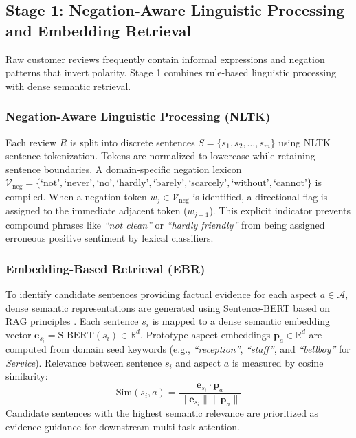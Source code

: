 \documentclass{llncs}
\begin{document}
\subsection{Stage 1: Negation-Aware Linguistic Processing and Embedding Retrieval}
\label{subsec:stage1_nltk_ebr}
Raw customer reviews frequently contain informal expressions and negation patterns that invert polarity. Stage 1 combines rule-based linguistic processing with dense semantic retrieval.

\subsubsection{Negation-Aware Linguistic Processing (NLTK)}
Each review $R$ is split into discrete sentences $S = \{s_1, s_2, \dots, s_m\}$ using NLTK sentence tokenization. Tokens are normalized to lowercase while retaining sentence boundaries. A domain-specific negation lexicon $\mathcal{V}_{\text{neg}} = \{\text{`not'}, \text{`never'}, \text{`no'}, \text{`hardly'}, \text{`barely'}, \text{`scarcely'}, \text{`without'}, \text{`cannot'}\}$ is compiled. When a negation token $w_j \in \mathcal{V}_{\text{neg}}$ is identified, a directional flag is assigned to the immediate adjacent token ($w_{j+1}$). This explicit indicator prevents compound phrases like \textit{``not clean''} or \textit{``hardly friendly''} from being assigned erroneous positive sentiment by lexical classifiers.

\subsubsection{Embedding-Based Retrieval (EBR)}
To identify candidate sentences providing factual evidence for each aspect $a \in \mathcal{A}$, dense semantic representations are generated using Sentence-BERT \cite{ref24_reimers2019} based on RAG principles \cite{ref23_lewis2020}. Each sentence $s_i$ is mapped to a dense semantic embedding vector $\mathbf{e}_{s_i} = \text{S-BERT}(s_i) \in \mathbb{R}^d$. Prototype aspect embeddings $\mathbf{p}_a \in \mathbb{R}^d$ are computed from domain seed keywords (e.g., \textit{``reception''}, \textit{``staff''}, and \textit{``bellboy''} for \textit{Service}). Relevance between sentence $s_i$ and aspect $a$ is measured by cosine similarity:
\begin{equation}
\text{Sim}(s_i, a) = \frac{\mathbf{e}_{s_i} \cdot \mathbf{p}_a}{\|\mathbf{e}_{s_i}\| \|\mathbf{p}_a\|}
\end{equation}
Candidate sentences with the highest semantic relevance are prioritized as evidence guidance for downstream multi-task attention.
\end{document}
